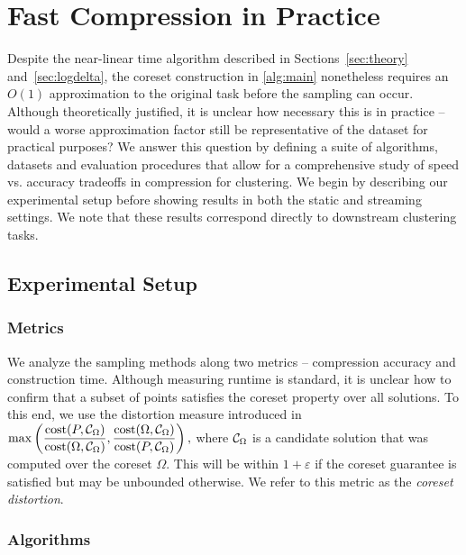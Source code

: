 \section{Fast Compression in Practice}

Despite the near-linear time algorithm described in Sections~\ref{sec:theory} and~\ref{sec:logdelta}, the coreset construction in \ref{alg:main} nonetheless
requires an $O(1)$ approximation to the original task before the sampling can occur. Although theoretically justified, it is unclear how necessary this is in
practice -- would a worse approximation factor still be representative of the dataset for practical purposes? We answer this question by defining a suite of
algorithms, datasets and evaluation procedures that allow for a comprehensive study of speed vs. accuracy tradeoffs in compression for clustering.  We begin by
describing our experimental setup before showing results in both the static and streaming settings.  We note that these results correspond directly to
downstream clustering tasks.

\subsection{Experimental Setup}
\subsubsection{Metrics}
\label{sssec:metrics}

We analyze the sampling methods along two metrics -- compression accuracy and construction time. Although measuring runtime is standard, it is unclear how to
confirm that a subset of points satisfies the coreset property over all solutions. To this end, we use the distortion measure introduced in~\cite{chrisESA} $
\max \left( \dfrac{\operatorname{cost}(P, \mathcal C_{\Omega})}{\operatorname{cost}(\Omega, \mathcal C_{\Omega})}, \dfrac{\operatorname{cost}(\Omega, \mathcal C_{\Omega})}{\operatorname{cost}(P, \mathcal C_{\Omega})} \right),$ where
$\mathcal C_{\Omega}$ is a candidate solution that was computed over the coreset $\Omega$. This will be within $1+\varepsilon$ if the coreset guarantee is satisfied
but may be unbounded otherwise.  We refer to this metric as the \emph{coreset distortion}.

\subsubsection{Algorithms}
\label{ssec:algorithms}

